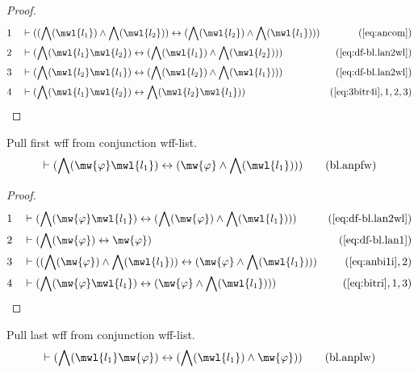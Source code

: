 \begin{proof}
\begin{align}
  1 &&  & \vdash ( ( \bigwedge( \mwl{l_1} ) \wedge \bigwedge( \mwl{l_2} ) )
     \leftrightarrow ( \bigwedge( \mwl{l_2} ) \wedge
     \bigwedge( \mwl{l_1} ) )
     )&(\mbox{\ref{eq:ancom}})\notag
  \\ 2 &&  & \vdash ( \bigwedge( \mwl{l_1} \mwl{l_2} ) \leftrightarrow (
     \bigwedge( \mwl{l_1} ) \wedge \bigwedge( \mwl{l_2} )
     ) )&(\mbox{\ref{eq:df-bl.lan2wl}})\notag
  \\ 3 &&  & \vdash ( \bigwedge( \mwl{l_2} \mwl{l_1} ) \leftrightarrow (
     \bigwedge( \mwl{l_2} ) \wedge \bigwedge( \mwl{l_1} )
     ) )&(\mbox{\ref{eq:df-bl.lan2wl}})\notag
  \\ 4 &&  & \vdash ( \bigwedge( \mwl{l_1} \mwl{l_2} ) \leftrightarrow
     \bigwedge( \mwl{l_2} \mwl{l_1} )
     )&(\mbox{\ref{eq:3bitr4i}},1,2,3)\notag
\end{align}
\end{proof}

\begin{lemma} {Pull first wff from conjunction wff-list.}
\begin{align}
\vdash ( \bigwedge( \mw{\varphi} \mwl{l_1} ) \leftrightarrow ( \mw{\varphi}
    \wedge \bigwedge( \mwl{l_1} ) ) )\label{eq:bl.anpfw}\tag{bl.anpfw}
\end{align}
\end{lemma}


\begin{proof}
\begin{align}
  1 &&  & \vdash ( \bigwedge( \mw{\varphi} \mwl{l_1} ) \leftrightarrow (
     \bigwedge( \mw{\varphi} ) \wedge \bigwedge( \mwl{l_1}
     ) ) )&(\mbox{\ref{eq:df-bl.lan2wl}})\notag
  \\ 2 &&  & \vdash ( \bigwedge( \mw{\varphi} ) \leftrightarrow \mw{\varphi}
     )&(\mbox{\ref{eq:df-bl.lan1}})\notag
  \\ 3 &&  & \vdash ( ( \bigwedge( \mw{\varphi} ) \wedge \bigwedge( \mwl{l_1} )
     ) \leftrightarrow ( \mw{\varphi} \wedge \bigwedge(
     \mwl{l_1} ) ) )&(\mbox{\ref{eq:anbi1i}},2)\notag
  \\ 4 &&  & \vdash ( \bigwedge( \mw{\varphi} \mwl{l_1} ) \leftrightarrow (
     \mw{\varphi} \wedge \bigwedge( \mwl{l_1} ) )
     )&(\mbox{\ref{eq:bitri}},1,3)\notag
\end{align}
\end{proof}

\begin{lemma} {Pull last wff from conjunction wff-list.}
\begin{align}
\vdash ( \bigwedge( \mwl{l_1} \mw{\varphi} ) \leftrightarrow ( \bigwedge(
    \mwl{l_1} ) \wedge \mw{\varphi} ) )\label{eq:bl.anplw}\tag{bl.anplw}
\end{align}
\end{lemma}


